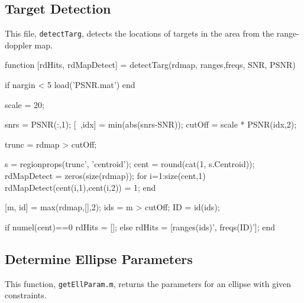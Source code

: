 \documentclass[12pt,openany,a4paper]{book}
\begin{document}
\subsection{Target Detection}
\label{app:tdetect}
This file, \verb+detectTarg+, detects the locations of targets in the area from the range-doppler map.

\begin{spverbatim}
function [rdHits, rdMapDetect] = detectTarg(rdmap, ranges,freqs, SNR, PSNR)
%
%

if nargin < 5
    load('PSNR.mat')
end

scale = 20; %

snrs = PSNR(:,1);
[~,idx] = min(abs(snrs-SNR));
cutOff = scale * PSNR(idx,2);

trunc = rdmap > cutOff;

s  = regionprops(trunc', 'centroid');
cent = round(cat(1, s.Centroid));
rdMapDetect = zeros(size(rdmap));
for i=1:size(cent,1)
    rdMapDetect(cent(i,1),cent(i,2)) = 1;
end

[m, id] = max(rdmap,[],2);
ids = m > cutOff;
ID = id(ids);

if numel(cent)==0
    rdHits = [];
else
    rdHits = [ranges(ids)', freqs(ID)'];
end

\end{spverbatim}

\subsection{Determine Ellipse Parameters}
\label{app:ellParam}
This function, \verb+getEllParam.m+, returns the parameters for an ellipse with given constraints.
\end{document}
